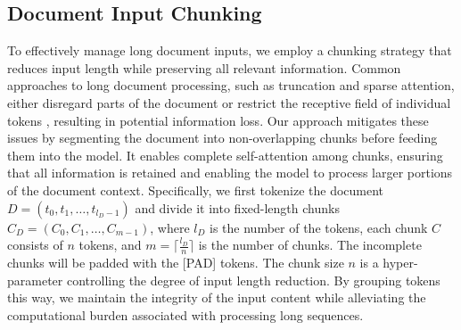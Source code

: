\documentclass[11pt]{article}
\begin{document}
\subsection{Document Input Chunking}
To effectively manage long document inputs, we employ a chunking strategy that reduces input length while preserving all relevant information.
Common approaches to long document processing, such as truncation and sparse attention, either disregard parts of the document\citep{lewis2020bart,park2022efficient} or restrict the receptive field of individual tokens \citep{beltagy2020longformer,zaheer2020big,brown2020language}, resulting in potential information loss.
Our approach mitigates these issues by segmenting the document into non-overlapping chunks before feeding them into the model. It enables complete self-attention among chunks, ensuring that all information is retained and enabling the model to process larger portions of the document context. Specifically, we first tokenize the document $D = (t_0, t_1, \dots, t_{l_{D}-1})$ and divide it into fixed-length chunks $C_D = (C_0, C_1, \dots, C_{m-1})$, where $l_{D}$ is the number of the tokens, each chunk $C$ consists of $n$ tokens, and $m= \lceil {\frac{l_{D}}{n}} \rceil$ is the number of chunks. The incomplete chunks will be padded with the [PAD] tokens. The chunk size $n$ is a hyper-parameter controlling the degree of input length reduction. By grouping tokens this way, we maintain the integrity of the input content while alleviating the computational burden associated with processing long sequences.
\end{document}
